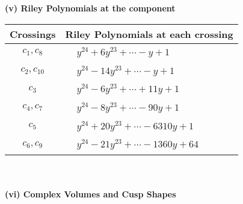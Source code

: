 \documentclass[1p]{elsarticle_modified}
\theoremstyle{definition}
\begin{document}
\newpage\renewcommand{\arraystretch}{1}
\flushleft \textbf{(v) Riley Polynomials at the component}\newline \\
\begin{tabular}{m{50pt}|m{274pt}}
Crossings & \hspace{64pt}Riley Polynomials at each crossing \\
\hline $$\begin{aligned}c_{1},c_{8}\end{aligned}$$&$\begin{aligned}
&y^{24}+6 y^{23}+\cdots- y+1
\end{aligned}$\\
\hline $$\begin{aligned}c_{2},c_{10}\end{aligned}$$&$\begin{aligned}
&y^{24}-14 y^{23}+\cdots- y+1
\end{aligned}$\\
\hline $$\begin{aligned}c_{3}\end{aligned}$$&$\begin{aligned}
&y^{24}-6 y^{23}+\cdots+11 y+1
\end{aligned}$\\
\hline $$\begin{aligned}c_{4},c_{7}\end{aligned}$$&$\begin{aligned}
&y^{24}-8 y^{23}+\cdots-90 y+1
\end{aligned}$\\
\hline $$\begin{aligned}c_{5}\end{aligned}$$&$\begin{aligned}
&y^{24}+20 y^{23}+\cdots-6310 y+1
\end{aligned}$\\
\hline $$\begin{aligned}c_{6},c_{9}\end{aligned}$$&$\begin{aligned}
&y^{24}-21 y^{23}+\cdots-1360 y+64
\end{aligned}$\\
\hline
\end{tabular}\\~\\
\newpage\flushleft \textbf{(vi) Complex Volumes and Cusp Shapes}
\end{document}
